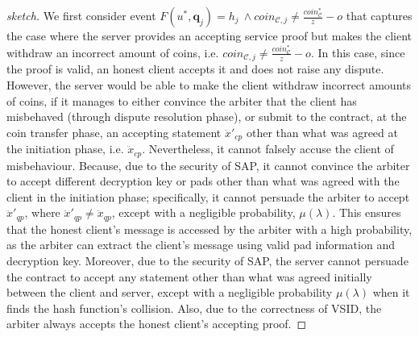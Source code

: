  \begin{proof}[sketch]
 We first consider event $F(u^{\scriptscriptstyle *},\bm{q}_{\scriptscriptstyle j})= h_{\scriptscriptstyle j}\ \wedge coin_{\scriptscriptstyle\mathcal{C},j}\neq  \frac{coin_{\scriptscriptstyle\mathcal C}^{\scriptscriptstyle*}}{z}-o$ that captures the case where the server provides an accepting service proof but makes the client withdraw an incorrect amount of coins, i.e. $coin_{\scriptscriptstyle\mathcal{C},j}\neq  \frac{coin_{\scriptscriptstyle\mathcal C}^{\scriptscriptstyle*}}{z}-o$. In this case, since the proof is valid, an honest client accepts it and does not raise any dispute. 
  However, the server  would be able to make the client  withdraw incorrect amounts of coins, if it manages to either convince the arbiter that the client has misbehaved (through dispute resolution phase), or submit to the contract, at the coin transfer phase,  an accepting  statement $\ddot{x}'_{\scriptscriptstyle cp}$ other than what was agreed at the initiation phase, i.e. $\ddot{x}_{\scriptscriptstyle cp}$. Nevertheless, it cannot falsely accuse the client of misbehaviour. Because,  due to the security of SAP, it cannot  convince the arbiter to accept different decryption key or pads other than what was agreed with the client in the initiation phase; specifically, it cannot persuade the arbiter to accept  $\ddot{x}'_{\scriptscriptstyle qp}$, where $\ddot{x}'_{\scriptscriptstyle qp}\neq \ddot{x}_{\scriptscriptstyle qp}$, except with a negligible probability, $\mu(\lambda)$. This ensures that the honest client's message is accessed by  the arbiter with a high probability, as the arbiter can extract the client's message using valid pad information and decryption key. Moreover,  due to the security of SAP, the server cannot persuade the contract to accept any statement other than what was agreed initially between the client and server, except with a negligible probability $\mu(\lambda)$ when it finds the hash function's collision. Also, due to the correctness of VSID, the arbiter always accepts the honest client's accepting proof. 


\end{proof}
